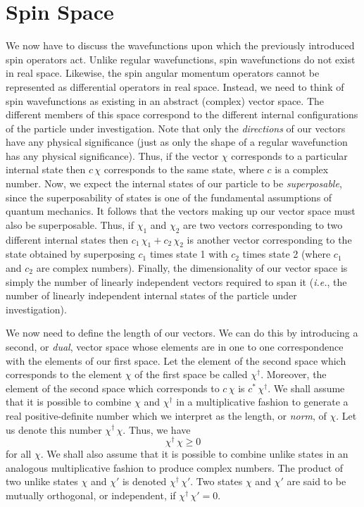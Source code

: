 \section{Spin Space}\label{s10.3}
We now have to discuss the wavefunctions upon which the previously introduced
spin operators act. Unlike regular wavefunctions, spin wavefunctions
do not exist in real space. Likewise, the spin angular momentum operators
cannot be represented as differential operators in real space.
Instead, we need to think of spin wavefunctions as
existing in an abstract (complex) vector space. The different members of
this space correspond to the different internal configurations of the particle
under investigation.
Note that only the {\em directions}\/ of our vectors have any physical significance
(just as only the shape of a regular wavefunction has any physical
significance). Thus,
if the vector $\chi$  corresponds to a particular internal state then
$c\,\chi$ corresponds to the same state, where $c$ is a complex number.
Now, we expect the internal states of our particle to be {\em superposable},
since the superposability of states is one of the fundamental assumptions of
quantum mechanics.
It follows that the vectors making up our vector space must also be superposable.
Thus, if $\chi_1$ and $\chi_2$ are two vectors corresponding to two
different internal states then $c_1\,\chi_1+c_2\,\chi_2$ is another vector
corresponding to the state obtained by superposing $c_1$ times state 1
with $c_2$ times state 2 (where $c_1$ and $c_2$ are complex numbers). Finally, the dimensionality of our vector
space is simply the number of linearly independent vectors required to span
it ({\em i.e.}, the number of linearly independent internal states of the
particle under investigation).

We now need to define the length of our vectors. We can do this by
introducing a second, or {\em dual}, vector space whose elements are in one to one
correspondence with the elements of our first space. Let the element of the second
space which corresponds to the element $\chi$ of the first space
be called $\chi^\dag$. Moreover, the element of the second space
which corresponds to $c\,\chi$ is $c^\ast\,\chi^\dag$. We shall assume
that it is possible to combine $\chi$ and $\chi^\dag$ in a multiplicative
fashion to generate a real
positive-definite number which we interpret as the length, or {\em norm},
of $\chi$. Let us denote this number $\chi^\dag\,\chi$. Thus, we
have
\begin{equation}\label{e10.11}
\chi^\dag\,\chi\geq 0
\end{equation}
for all $\chi$. We shall also assume that it is possible to combine unlike states
in an analogous multiplicative fashion to produce complex numbers. The
product of two unlike states $\chi$ and $\chi'$ is denoted $\chi^\dag\,\chi'$.
Two states $\chi$ and $\chi'$ are said to be mutually orthogonal, or independent,
if $\chi^\dag\,\chi' = 0$.

